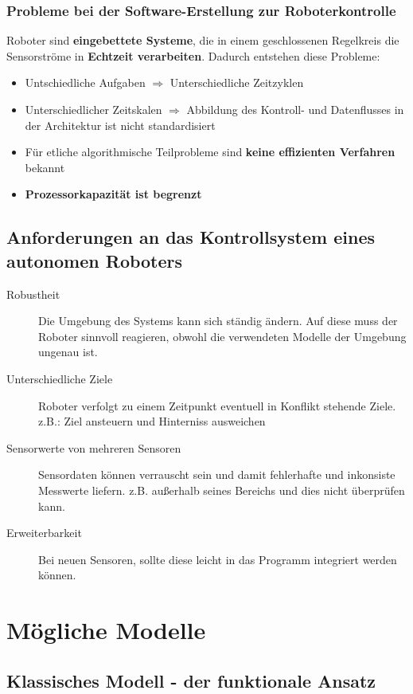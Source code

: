 \subsubsection{Probleme bei der Software-Erstellung zur Roboterkontrolle}
Roboter sind \textbf{eingebettete Systeme}, die in einem geschlossenen
Regelkreis die Sensorströme in \textbf{Echtzeit verarbeiten}. Dadurch entstehen
diese Probleme:

\begin{itemize}
	\item Untschiedliche Aufgaben $\Rightarrow$ Unterschiedliche Zeitzyklen
	\item Unterschiedlicher Zeitskalen $\Rightarrow$ Abbildung des Kontroll-
		und Datenflusses in der Architektur ist nicht standardisiert
	\item Für etliche algorithmische Teilprobleme sind \textbf{keine effizienten
		Verfahren} bekannt
	\item \textbf{Prozessorkapazität ist begrenzt}
\end{itemize}

\subsection{Anforderungen an das Kontrollsystem eines autonomen Roboters}

\begin{description}
	\item[Robustheit]
		Die Umgebung des Systems kann sich ständig ändern. Auf diese muss der
		Roboter sinnvoll reagieren, obwohl die verwendeten Modelle der Umgebung
		ungenau ist.
	\item[Unterschiedliche Ziele]
		Roboter verfolgt zu einem Zeitpunkt eventuell in Konflikt stehende Ziele.
		z.B.: Ziel ansteuern und Hinterniss ausweichen
	\item[Sensorwerte von mehreren Sensoren]
		Sensordaten können verrauscht sein und damit fehlerhafte und inkonsiste
		Messwerte liefern. z.B. außerhalb seines Bereichs und dies nicht überprüfen
		kann.
	\item[Erweiterbarkeit]
		Bei neuen Sensoren, sollte diese leicht in das Programm integriert werden
		können.
\end{description}

\section{Mögliche Modelle}

\subsection{Klassisches Modell - der funktionale Ansatz}

